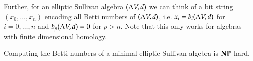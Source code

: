  Further, for an elliptic Sullivan algebra $(\Lambda V,d)$ we can think of a bit string $(x_0, \ldots, x_n)$ encoding all 
 Betti numbers of $(\Lambda V,d)$, i.e. $x_i = b_i (\Lambda V,d)$ for $i = 0,\ldots, n$ and $b_p (\Lambda V,d) = 0$ for $p > n$.
 Note that this only works for algebras with finite dimensional homology.
  
  
 
 \begin{Corollary}
 \label{thm:AlgebrasComputingBettiNumbers}
  Computing the Betti numbers of a minimal elliptic Sullivan algebra is $\mathbf{NP}$-hard.
 \end{Corollary}

%  
% 
%  

